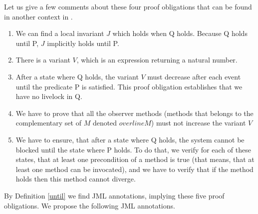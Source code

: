 Let us give a few comments about these four proof obligations that can be found in another context in \cite{Abrial:1998:IDC,abrial96}.
\begin{enumerate}
\item We can find a local invariant $J$ which holds when Q holds. Because Q holds until P, $J$ implicitly holds until P.
\item There is a variant $V$, which is an expression returning a natural number.
\item After a state where Q holds, the variant $V$ must decrease after each event until the predicate P is satisfied. This proof obligation establishes that we have no livelock in Q.
\item We have to prove that all the observer methods (methods that belongs to the complementary set of $M$ denoted $overline{M}$) must not increase the variant $V$
\item We have to ensure, that after a state where Q holds, the system cannot be blocked until the state where P holds. To do that, we verify for each of these states, that at least one precondition of a method is true (that means, that at least one method can be invocated), and we have to verify that if the method holds then this method cannot diverge.
\end{enumerate}

By Definition \ref{until} we find JML annotations, implying these five proof obligations. We propose the following JML annotations.

